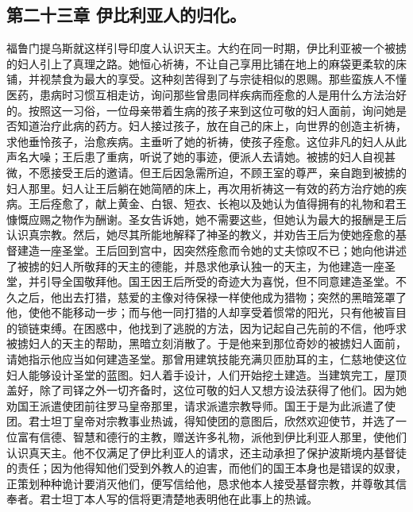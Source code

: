 
\subsection{第二十三章 伊比利亚人的归化。}

福鲁门提乌斯就这样引导印度人认识天主。大约在同一时期，伊比利亚被一个被掳的妇人引上了真理之路。她恒心祈祷，不让自己享用比铺在地上的麻袋更柔软的床铺，并视禁食为最大的享受。这种刻苦得到了与宗徒相似的恩赐。那些蛮族人不懂医药，患病时习惯互相走访，询问那些曾患同样疾病而痊愈的人是用什么方法治好的。按照这一习俗，一位母亲带着生病的孩子来到这位可敬的妇人面前，询问她是否知道治疗此病的药方。妇人接过孩子，放在自己的床上，向世界的创造主祈祷，求他垂怜孩子，治愈疾病。主垂听了她的祈祷，使孩子痊愈。这位非凡的妇人从此声名大噪；王后患了重病，听说了她的事迹，便派人去请她。被掳的妇人自视甚微，不愿接受王后的邀请。但王后因急需所迫，不顾王室的尊严，亲自跑到被掳的妇人那里。妇人让王后躺在她简陋的床上，再次用祈祷这一有效的药方治疗她的疾病。王后痊愈了，献上黄金、白银、短衣、长袍以及她认为值得拥有的礼物和君王慷慨应赐之物作为酬谢。圣女告诉她，她不需要这些，但她认为最大的报酬是王后认识真宗教。然后，她尽其所能地解释了神圣的教义，并劝告王后为使她痊愈的基督建造一座圣堂。王后回到宫中，因突然痊愈而令她的丈夫惊叹不已；她向他讲述了被掳的妇人所敬拜的天主的德能，并恳求他承认独一的天主，为他建造一座圣堂，并引导全国敬拜他。国王因王后所受的奇迹大为喜悦，但不同意建造圣堂。不久之后，他出去打猎，慈爱的主像对待保禄一样使他成为猎物；突然的黑暗笼罩了他，使他不能移动一步；而与他一同打猎的人却享受着惯常的阳光，只有他被盲目的锁链束缚。在困惑中，他找到了逃脱的方法，因为记起自己先前的不信，他呼求被掳妇人的天主的帮助，黑暗立刻消散了。于是他来到那位奇妙的被掳妇人面前，请她指示他应当如何建造圣堂。那曾用建筑技能充满贝匝肋耳的主，仁慈地使这位妇人能够设计圣堂的蓝图。妇人着手设计，人们开始挖土建造。当建筑完工，屋顶盖好，除了司铎之外一切齐备时，这位可敬的妇人又想方设法获得了他们。因为她劝国王派遣使团前往罗马皇帝那里，请求派遣宗教导师。国王于是为此派遣了使团。君士坦丁皇帝对宗教事业热诚，得知使团的意图后，欣然欢迎使节，并选了一位富有信德、智慧和德行的主教，赠送许多礼物，派他到伊比利亚人那里，使他们认识真天主。他不仅满足了伊比利亚人的请求，还主动承担了保护波斯境内基督徒的责任；因为他得知他们受到外教人的迫害，而他们的国王本身也是错误的奴隶，正策划种种诡计要消灭他们，便写信给他，恳求他本人接受基督宗教，并尊敬其信奉者。君士坦丁本人写的信将更清楚地表明他在此事上的热诚。\par


